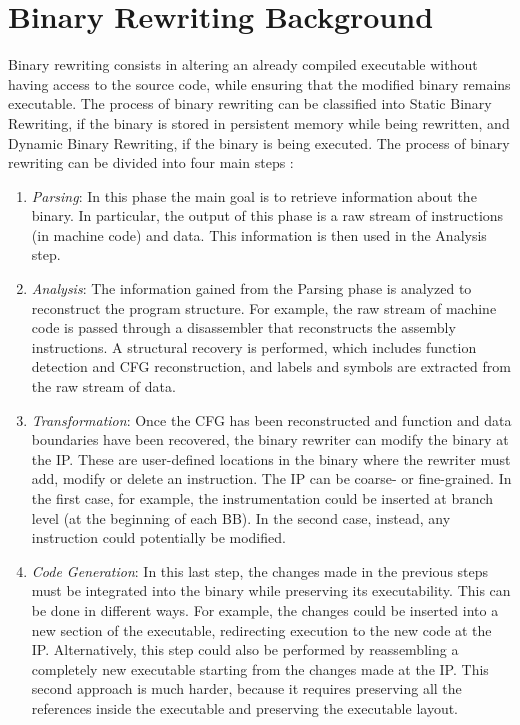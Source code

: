 \section{Binary Rewriting Background}\label{sec:biniary_rewriting}
        Binary rewriting consists in altering an already compiled executable without having access to the source code,
        while ensuring that the modified binary remains executable.
        The process of binary rewriting can be classified into Static Binary Rewriting, if the binary is stored in
        persistent memory while being rewritten, and Dynamic Binary Rewriting, if the binary is being executed.
        The process of binary rewriting can be divided into four main steps \cite{binaryrewriting}:
        \begin{enumerate}
            \item \textit{Parsing}: In this phase the main goal is to retrieve information about the binary.
                In particular, the output of this phase is a raw stream of instructions (in machine code) and data.
                This information is then used in the Analysis step.

            \item \textit{Analysis}: The information gained from the Parsing phase is analyzed to reconstruct the program structure.
            For example, the raw stream of machine code is passed through a disassembler that reconstructs the
            assembly instructions. A structural recovery is performed, which includes function detection and \gls{CFG} reconstruction,
            and labels and symbols are extracted from the raw stream of data.

            \item \textit{Transformation}: Once the \gls{CFG} has been reconstructed and function and data boundaries have been recovered,
                the binary rewriter can modify the binary at the \gls{IP}. These are user-defined locations in the binary where
                the rewriter must add, modify or delete an instruction. The \gls{IP} can be coarse- or fine-grained.
                In the first case, for example, the instrumentation could be inserted at branch level (at the beginning of each \gls{BB}).
                In the second case, instead, any instruction could potentially be modified.

            \item \textit{Code Generation}: In this last step, the changes made in the previous steps must be integrated into the
                binary while preserving its executability. This can be done in different ways. For example, the changes could be
                inserted into a new section of the executable, redirecting execution to the new code at the \gls{IP}.
                Alternatively, this step could also be performed by reassembling a completely new executable starting from the
                changes made at the \gls{IP}. This second approach is much harder, because it requires preserving all the
                references inside the executable and preserving the executable layout.
        \end{enumerate}
